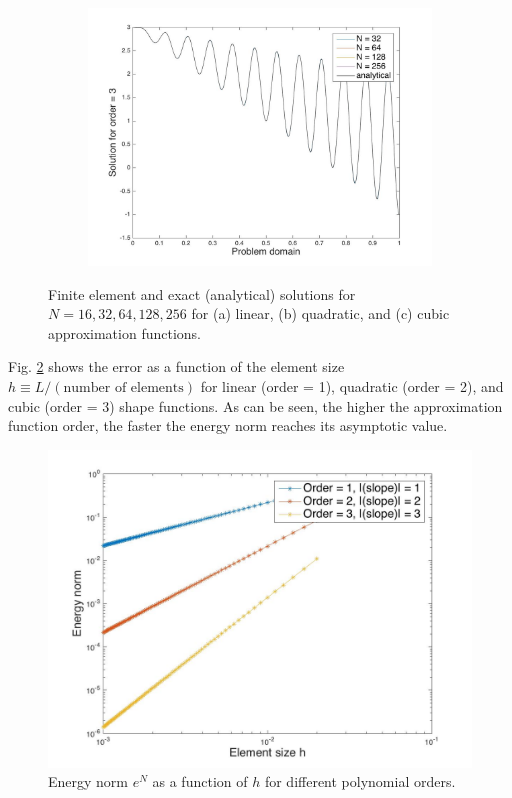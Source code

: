 \documentclass[10pt]{article}
\begin{document}
\begin{figure}[H]
\begin{subfigure}{.48\textwidth}
  \includegraphics[width=1.0\linewidth]{Nplot_for_order_3.jpg}
  \caption{}
\end{subfigure}
\caption{Finite element and exact (analytical) solutions for \(N=16, 32, 64, 128, 256\) for (a) linear, (b) quadratic, and (c) cubic approximation functions.}
\label{fig:Nplots}
\end{figure}

Fig. \ref{fig:eN_vs_h} shows the error as a function of the element size \(h \equiv L/(\textrm{number of elements})\) for linear (order = 1), quadratic (order = 2), and cubic (order = 3) shape functions. As can be seen, the higher the approximation function order, the faster the energy norm reaches its asymptotic value. 

\begin{figure}[H]
  \centering
  \includegraphics[width=13cm]{eN_vs_h.jpg}
  \caption{Energy norm \(e^N\) as a function of \(h\) for different polynomial orders.}
  \label{fig:eN_vs_h}
\end{figure}
\end{document}
